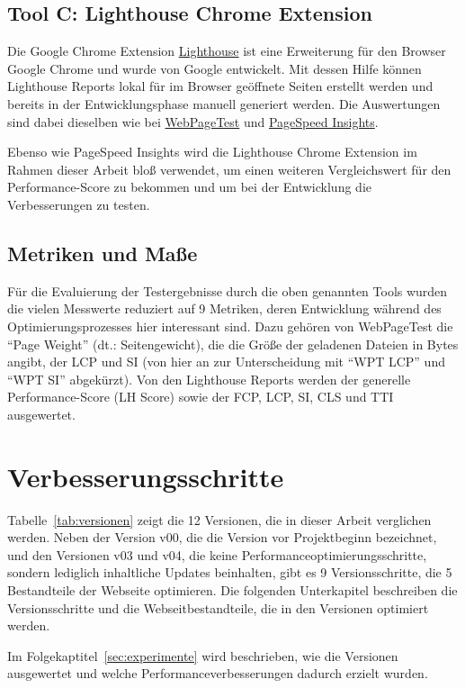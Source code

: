 \documentclass[11pt,a4paper]{article}
\begin{document}
\subsection{Tool C: Lighthouse Chrome Extension}\label{subsec:Lighthouse}
Die Google Chrome Extension \href{https://chromewebstore.google.com/detail/lighthouse/blipmdconlkpinefehnmjammfjpmpbjk}{Lighthouse} ist eine Erweiterung für den Browser Google Chrome und wurde von Google entwickelt.
Mit dessen Hilfe können Lighthouse Reports lokal für im Browser geöffnete Seiten erstellt werden und bereits in der Entwicklungsphase manuell generiert werden.
Die Auswertungen sind dabei dieselben wie bei \hyperref[subsec:WebPageTest]{WebPageTest} und \hyperref[subsec:PageSpeed]{PageSpeed Insights}.

Ebenso wie PageSpeed Insights wird die Lighthouse Chrome Extension im Rahmen dieser Arbeit bloß verwendet, um einen weiteren Vergleichswert für den Performance-Score zu bekommen und um bei der Entwicklung die Verbesserungen zu testen.

\subsection{Metriken und Maße}
Für die Evaluierung der Testergebnisse durch die oben genannten Tools wurden die vielen Messwerte reduziert auf 9 Metriken, deren Entwicklung während des Optimierungsprozesses hier interessant sind.
Dazu gehören von WebPageTest die \enquote{Page Weight} (dt.: Seitengewicht), die die Größe der geladenen Dateien in Bytes angibt, der LCP und SI (von hier an zur Unterscheidung mit \enquote{WPT LCP} und \enquote{WPT SI} abgekürzt).
Von den Lighthouse Reports werden der generelle Performance-Score (LH Score) sowie der FCP, LCP, SI, CLS und TTI ausgewertet.

\section{Verbesserungsschritte}
Tabelle~\ref{tab:versionen} zeigt die 12 Versionen, die in dieser Arbeit verglichen werden.
Neben der Version v00, die die Version vor Projektbeginn bezeichnet, und den Versionen v03 und v04, die keine Performanceoptimierungsschritte, sondern lediglich inhaltliche Updates beinhalten, gibt es 9 Versionsschritte, die 5 Bestandteile der Webseite optimieren.
Die folgenden Unterkapitel beschreiben die Versionsschritte und die Webseitbestandteile, die in den Versionen optimiert werden.

Im Folgekaptitel~\ref{sec:experimente} wird beschrieben, wie die Versionen ausgewertet und welche Performanceverbesserungen dadurch erzielt wurden.
\end{document}
